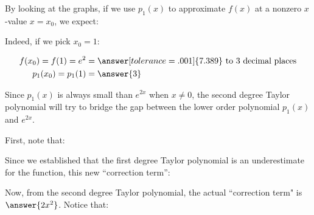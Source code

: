 \documentclass{ximera}
\begin{document}
\begin{exercise}
\begin{exercise}
\begin{image}
\begin{tikzpicture}
\end{tikzpicture}
\end{image}

By looking at the graphs, if we use $p_1(x)$ to approximate $f(x)$ at a nonzero $x$-value $x=x_0$, we expect:
\begin{multipleChoice}
\end{multipleChoice}

Indeed, if we pick $x_0 = 1$:

\begin{align*}
f(x_0)=f(1) = e^2 &= \answer[tolerance=.001]{7.389} \textrm{ to $3$ decimal places}\\
p_1(x_0) = p_1(1) &= \answer{3}
\end{align*}

\end{exercise}

\begin{exercise}
Since $p_1(x)$ is always small than $e^{2x}$ when $x \neq 0$, the second degree Taylor polynomial will try to bridge the gap between the lower order polynomial $p_1(x)$ and $e^{2x}$.  

First, note that:

\begin{image}
  \end{image}

Since we established that the first degree Taylor polynomial is an underestimate for the function, this new ``correction term'':

\begin{multipleChoice}
\end{multipleChoice}

Now, from the second degree Taylor polynomial, the actual ``correction term" is $\answer{2x^2}$.  Notice that:
\begin{multipleChoice}
\end{multipleChoice}


\end{exercise}
\end{exercise}
\end{document}
